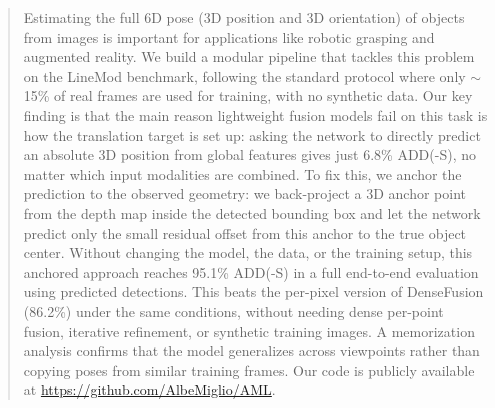 \begin{abstract}
Estimating the full 6D pose (3D position and 3D orientation) of objects from images is important for applications like robotic grasping and augmented reality. We build a modular pipeline that tackles this problem on the LineMod benchmark, following the standard protocol where only $\sim$15\% of real frames are used for training, with no synthetic data. Our key finding is that the main reason lightweight fusion models fail on this task is how the translation target is set up: asking the network to directly predict an absolute 3D position from global features gives just 6.8\% ADD(-S), no matter which input modalities are combined. To fix this, we anchor the prediction to the observed geometry: we back-project a 3D anchor point from the depth map inside the detected bounding box and let the network predict only the small residual offset from this anchor to the true object center. Without changing the model, the data, or the training setup, this anchored approach reaches 95.1\% ADD(-S) in a full end-to-end evaluation using predicted detections. This beats the per-pixel version of DenseFusion (86.2\%) under the same conditions, without needing dense per-point fusion, iterative refinement, or synthetic training images. A memorization analysis confirms that the model generalizes across viewpoints rather than copying poses from similar training frames. Our code is publicly available at \url{https://github.com/AlbeMiglio/AML}.
\end{abstract}

